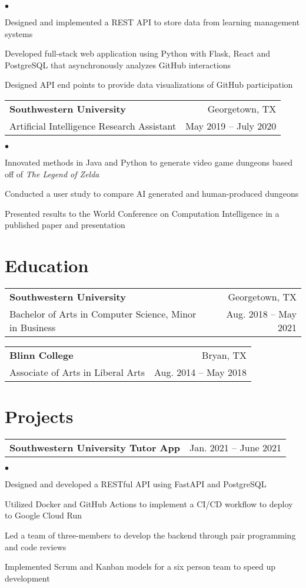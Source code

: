 \documentclass[margin, 11pt]{res}
\makeatletter
\newcommand{\resumeSubheading}[4]{

\begin{tabular*}{1.01\textwidth}{@{\hspace{-4pt}}l @{\extracolsep{\fill}} r}
\textbf{#1} & #2 \\
      {#3} &  {#4}
\end{tabular*}\vspace{-2pt}
}
\newcommand{\resumeSubSubheading}[2]{
\begin{tabular*}{1.01\textwidth}{@{\hspace{-4pt}}l @{\extracolsep{\fill}} r}
    #1 & #2 
\end{tabular*}\vspace{-7pt}
}
\newenvironment{list2}{
	\begin{list}{$\bullet$}{%
	    \small
		\setlength{\itemsep}{0in}
		\setlength{\parsep}{0in} \setlength{\parskip}{0in}
		\setlength{\topsep}{0in} \setlength{\partopsep}{0in}
		\setlength{\leftmargin}{0.2in}}}{\end{list}}
\makeatother
\begin{document}
\begin{resume}
\begin{list2}
\item{Designed and implemented a REST API to store data from learning management systems }
\item{Developed full-stack web application using Python with Flask, React and PostgreSQL that asynchronously analyzes GitHub interactions }
\item{Designed API end points to provide data visualizations of GitHub participation }
\end{list2}

\resumeSubheading{Southwestern University}{Georgetown, TX}
             {Artificial Intelligence Research Assistant}{May 2019 -- July 2020}

\begin{list2}
\item{Innovated methods in Java and Python to generate video game dungeons based off of \emph{The Legend of Zelda}}
\item{Conducted a user study to compare AI generated and human-produced dungeons}
\item{Presented results to the World Conference on Computation Intelligence in a published paper and presentation}
\end{list2}

\section{\sc Education}

\vspace{2pt}

\resumeSubheading{Southwestern University}{Georgetown, TX}
             {Bachelor of Arts in Computer Science, Minor in Business}{Aug. 2018 -- May 2021}

\resumeSubheading{Blinn College}{Bryan, TX}
             {Associate of Arts in Liberal Arts}{Aug. 2014 -- May 2018}

\section{\sc Projects}

\resumeSubSubheading{\textbf{Southwestern University Tutor App}}{Jan. 2021 -- June 2021}

\begin{list2}
\item{Designed and developed a RESTful API using FastAPI and PostgreSQL}
\item{Utilized Docker and GitHub Actions to implement a CI/CD workflow to deploy to Google Cloud Run}
\item{Led a team of three-members to develop the backend through pair programming and code reviews}
\item{Implemented Scrum and Kanban models for a six person team to speed up development}
\end{list2}


\end{resume}
\end{document}
